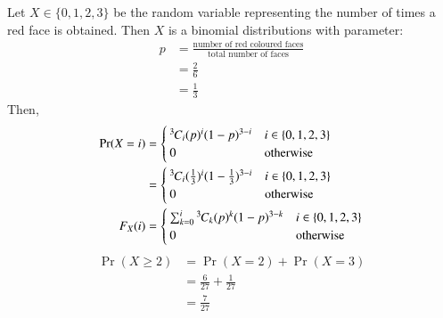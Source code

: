 
Let $X \in \{ 0, 1, 2, 3\}$ be the random variable representing the number of times a red face is obtained. Then $X$ is a binomial distributions with parameter:
\begin{align}
    p &= \frac{\text{number of red coloured faces}}{\text{total number of faces}}
    \\ &= \frac{2}{6}
    \\ &= \frac{1}{3}
\end{align}
Then,
\begin{align}
    \Pr(X=i) &= 
	\begin{cases}
	{{}^{3}\mkern-1muC_{i}}(p)^i(1-p)^{3-i} &  i \in \{0, 1, 2, 3\}\\ 
	0 & \text{otherwise}
	\end{cases}
	\\ &= 
	\begin{cases}
	{{}^{3}\mkern-1muC_{i}}(\frac{1}{3})^i(1-\frac{1}{3})^{3-i}  &  i \in \{0, 1, 2, 3\}\\ 
	0 & \text{otherwise}
	\end{cases}
    \\F_X(i) &= 
	\begin{cases}
	\sum_{k=0}^i{{}^{3}\mkern-1muC_{k}}(p)^k(1-p)^{3-k} &  i \in \{0, 1, 2, 3\}\\ 
	0 & \text{otherwise}
	\end{cases}
\end{align}
\begin{align}
    \Pr{(X \geq 2)} &= \Pr{(X=2)} + \Pr{(X=3)}
    \\&= \frac{6}{27} + \frac{1}{27}
    \\&= \frac{7}{27}
\end{align}